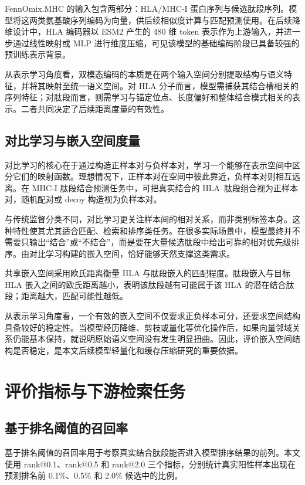 FennOmix.MHC 的输入包含两部分：HLA/MHC-I 蛋白序列与候选肽段序列。模型将这两类氨基酸序列编码为向量，供后续相似度计算与匹配预测使用。在后续降维设计中，HLA 编码器以 ESM2 产生的 480 维 token 表示作为上游输入，并进一步通过线性映射或 MLP 进行维度压缩，可见该模型的基础编码阶段已具备较强的预训练表示背景。

从表示学习角度看，双模态编码的本质是在两个输入空间分别提取结构与语义特征，并将其映射至统一语义空间。对 HLA 分子而言，模型需捕获其结合槽相关的序列特征；对肽段而言，则需学习与锚定位点、长度偏好和整体结合模式相关的表示。二者共同决定了后续距离度量的有效性。

\subsection{对比学习与嵌入空间度量}

对比学习的核心在于通过构造正样本对与负样本对，学习一个能够在表示空间中区分它们的映射函数。理想情况下，正样本对在空间中彼此靠近，负样本对则相互远离。在 MHC-I 肽段结合预测任务中，可把真实结合的 HLA–肽段组合视为正样本对，随机配对或 decoy 构造视为负样本对。

与传统监督分类不同，对比学习更关注样本间的相对关系，而非类别标签本身。这种特性使其尤其适合匹配、检索和排序类任务。在很多实际场景中，模型最终并不需要只输出“结合”或“不结合”，而是要在大量候选肽段中给出可靠的相对优先级排序。由对比学习构建的嵌入空间，恰好能够天然支撑这类需求。

共享嵌入空间采用欧氏距离衡量 HLA 与肽段嵌入的匹配程度。肽段嵌入与目标 HLA 嵌入之间的欧氏距离越小，表明该肽段越有可能属于该 HLA 的潜在结合肽段；距离越大，匹配可能性越低。

从表示学习角度看，一个有效的嵌入空间不仅要求正负样本可分，还要求空间结构具备较好的稳定性。当模型经历降维、剪枝或量化等优化操作后，如果向量邻域关系仍能基本保持，就说明原始语义空间没有发生明显扭曲。因此，评价嵌入空间结构是否稳定，是本文后续模型轻量化和缓存压缩研究的重要依据。

\section{评价指标与下游检索任务}

\subsection{基于排名阈值的召回率}

基于排名阈值的召回率用于考察真实结合肽段能否进入模型排序结果的前列。本文使用 rank@0.1、rank@0.5 和 rank@2.0 三个指标，分别统计真实阳性样本出现在预测排名前 0.1\%、0.5\% 和 2.0\% 候选中的比例。

